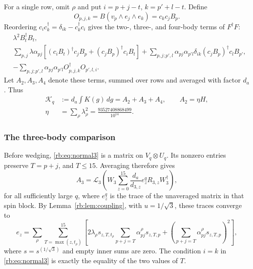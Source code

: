 For a single row, omit $\rho$ and put $i=p+j-t$, $k=p'+l-t$. Define
\[
 O_{p,j,k}=B(v_p\wedge e_j\wedge e_k)=c_kc_jB_p.
\]
Reordering $c_ic_k^\dagger=\delta_{ik}-c_k^\dagger c_i$ gives the two-, three-, and four-body terms of $F^\dagger F$:
\begin{align}
 &\lambda^2 B_t^\dagger B_t,\label{rb:eq:normal2}\\
 &\sum_{p,j}\lambda\alpha_{pj}\left[(c_iB_t)^\dagger c_jB_p
                         +(c_jB_p)^\dagger c_iB_t\right]
   +\sum_{p,j;p',l}\alpha_{pj}\alpha_{p'l}\delta_{ik}
                         (c_jB_p)^\dagger c_lB_{p'},\label{rb:eq:normal3}\\
 &-\sum_{p,j;p',l}\alpha_{pj}\alpha_{p'l}
                         O_{p,j,k}^\dagger O_{p',l,i}.\label{rb:eq:normal4}
\end{align}
Let $A_2,A_3,A_4$ denote these terms, summed over rows and averaged with factor $d_a$. Thus
\begin{equation}\label{rb:eq:Adecomp}
 \begin{aligned}
 \mathcal K_q&:=d_a\int K(g)\,dg=A_2+A_3+A_4,\qquad A_2=\eta H,\\
 \eta&=\sum_\rho\lambda_\rho^2=\frac{93527408868499}{10^{14}}.
 \end{aligned}
\end{equation}

\subsubsection{The three-body comparison}
Before wedging, \eqref{rb:eq:normal3} is a matrix on $V_q\otimes U_q$. Its nonzero entries preserve $T=p+j$, and $T\le15$. Averaging therefore gives
\begin{equation}\label{rb:eq:A3}
 A_3=\mathcal L_3\left(W_3\sum_{z=0}^{15}\frac{d_a}{d_{3,z}}e_z^q R_{3,z}W_3^\dagger\right),
\end{equation}
for all sufficiently large $q$, where $e_z^q$ is the trace of the unaveraged matrix in that spin block. By Lemma~\ref{rb:lem:coupling}, with $u=1/\sqrt3$, these traces converge to
\begin{equation}\label{rb:eq:ez}
 e_z=\sum_\rho\sum_{T=\max(z,t_\rho)}^{15}
 \left[2\lambda_\rho s_{z,T,t_\rho}
                   \sum_{p+j=T}\alpha^{\rho}_{pj}s_{z,T,p}
       +\left(\sum_{p+j=T}\alpha^{\rho}_{pj}s_{z,T,p}\right)^2\right],
\end{equation}
where $s=s^{(1/\sqrt3)}$ and empty inner sums are zero. The condition $i=k$ in \eqref{rb:eq:normal3} is exactly the equality of the two values of $T$.

